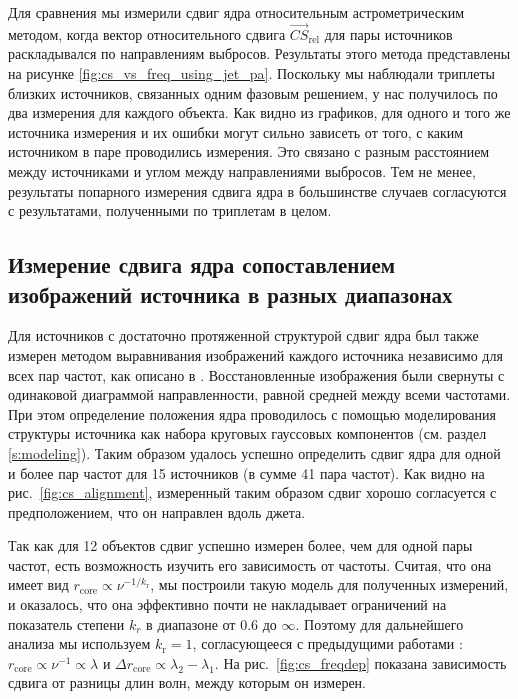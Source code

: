 Для сравнения мы измерили сдвиг ядра относительным астрометрическим методом, когда вектор
относительного сдвига $\vec{CS}_{\text{rel}}$ для пары источников раскладывался по направлениям
выбросов. Результаты этого
метода представлены на рисунке \ref{fig:cs_vs_freq_using_jet_pa}. Поскольку мы наблюдали триплеты
близких источников, связанных одним фазовым решением, у нас получилось по два измерения для каждого
объекта. Как видно из графиков, для одного и того же источника измерения и их ошибки могут сильно
зависеть от того, с каким источником в паре проводились измерения. Это связано с разным расстоянием
между источниками и углом между направлениями выбросов. Тем не менее, результаты попарного
измерения сдвига ядра в большинстве случаев согласуются с результатами, полученными по триплетам в
целом.

\subsection{Измерение сдвига ядра сопоставлением изображений источника в разных диапазонах}
\label{s:method_image}
Для источников с достаточно протяженной структурой сдвиг ядра был также измерен методом
выравнивания изображений каждого источника независимо для всех пар частот, как описано в
\cite{Plavin2018}. Восстановленные изображения были свернуты с одинаковой диаграммой направленности,
равной средней между всеми частотами. При этом определение положения ядра проводилось с помощью
моделирования структуры источника как набора круговых гауссовых компонентов (см. раздел
\ref{s:modeling}). Таким образом удалось успешно определить сдвиг ядра для одной и более пар частот
для 15 источников (в сумме 41 пара частот). Как видно на рис.~\ref{fig:cs_alignment}, измеренный
таким образом сдвиг хорошо согласуется с предположением, что он направлен вдоль джета.

Так как для 12 объектов сдвиг успешно измерен более, чем для одной пары частот, есть возможность
изучить его зависимость от частоты. Считая, что она имеет вид $r_\text{core} \propto
\nu^{-1/k_\text{r}}$, мы построили такую модель для полученных измерений, и оказалось, что она
эффективно почти не накладывает ограничений на показатель степени $k_r$ в диапазоне от $0.6$ до
$\infty$. Поэтому для дальнейшего анализа мы используем $k_\text{r} = 1$, согласующееся с
предыдущими работами \cite{Sokolovsky_2011}: $r_\text{core} \propto \nu^{-1} \propto \lambda$ и
$\Delta r_\text{core} \propto \lambda_2 - \lambda_1$. На рис.~\ref{fig:cs_freqdep} показана
зависимость сдвига от разницы длин волн, между которым он измерен.

